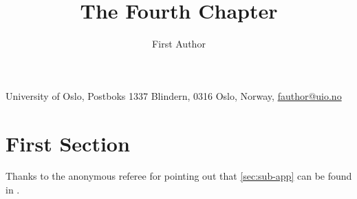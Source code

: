 \documentclass{standalone}
\begin{document}
\author{First Author\protect\footnotemark}
\title{The Fourth Chapter}
\maketitle
\label{pap:fourth}

\footnotetext
{%
    University of Oslo,
    Postboks 1337 Blindern, 0316 Oslo, Norway,
    \href{mailto:fauthor@uio.no}{fauthor@uio.no}
}

\begin{abstract}
    \kant[12] %
\end{abstract}

\section{First Section}
\kant[13-14]  %


\begin{acknowledgements}
    Thanks to the anonymous referee for pointing out that \cref{sec:sub-app} can be found in \cite{Har77}.
\end{acknowledgements}

\printbibliography[heading = subbibliography]
\end{document}
